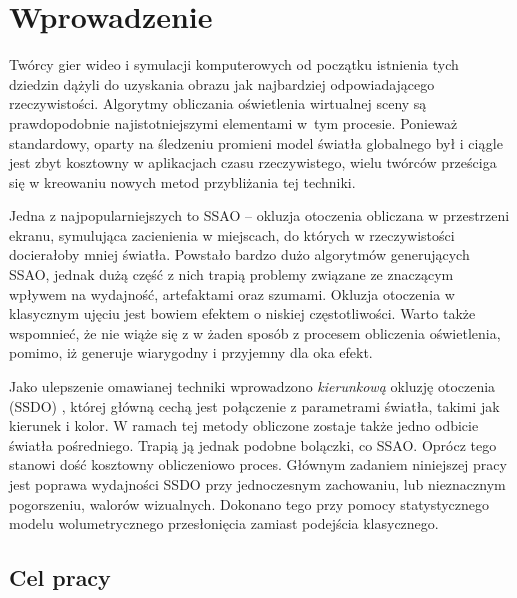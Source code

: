 \chapter{Wprowadzenie}
\label{t:wprowadzenie}

	
	Twórcy gier wideo i symulacji komputerowych od początku istnienia tych dziedzin dążyli do uzyskania obrazu jak najbardziej odpowiadającego rzeczywistości. Algorytmy obliczania oświetlenia wirtualnej sceny są prawdopodobnie najistotniejszymi elementami w~tym procesie. Ponieważ standardowy, oparty na śledzeniu promieni model światła globalnego był i ciągle jest zbyt kosztowny w aplikacjach czasu rzeczywistego, wielu twórców prześciga się w kreowaniu nowych metod przybliżania tej techniki. 
	
	Jedna z najpopularniejszych to SSAO -- okluzja otoczenia obliczana w przestrzeni ekranu, symulująca zacienienia w miejscach, do których w rzeczywistości docierałoby mniej światła. Powstało bardzo dużo algorytmów generujących SSAO, jednak dużą część z nich trapią problemy związane ze znaczącym wpływem na wydajność, artefaktami oraz szumami. Okluzja otoczenia w klasycznym ujęciu jest bowiem efektem o niskiej częstotliwości. Warto także wspomnieć, że nie wiąże się z w żaden sposób z procesem obliczenia oświetlenia, pomimo, iż generuje wiarygodny i przyjemny dla oka efekt.
	
	Jako ulepszenie omawianej techniki wprowadzono \emph{kierunkową} okluzję otoczenia (SSDO) \cite{ssdo}, której główną cechą jest połączenie z parametrami światła, takimi jak kierunek i kolor. W ramach tej metody obliczone zostaje także jedno odbicie światła pośredniego. Trapią ją jednak podobne bolączki, co SSAO. Oprócz tego stanowi dość kosztowny obliczeniowo proces. Głównym zadaniem niniejszej pracy jest poprawa wydajności SSDO przy jednoczesnym zachowaniu, lub nieznacznym pogorszeniu, walorów wizualnych. Dokonano tego przy pomocy statystycznego modelu wolumetrycznego przesłonięcia \cite{statvo} zamiast podejścia klasycznego.
		
	\section{Cel pracy}
	\label{t:wprowadzenie:cel}
	
	
